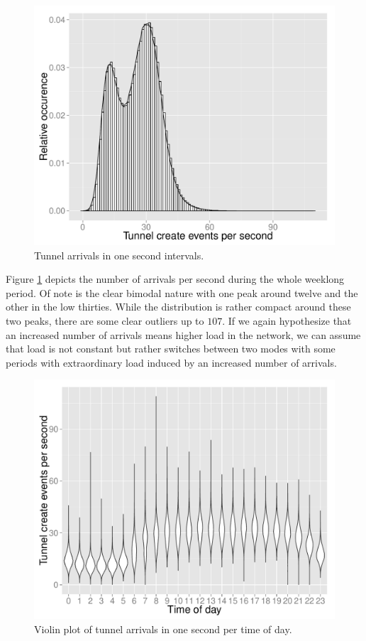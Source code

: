 \begin{figure}[htb]
	\centering
	\includegraphics[width=\columnwidth]{images/create_freq.pdf}
	\caption{Tunnel arrivals in one second intervals.}
	\label{c4:fig:freq-arrivals}
\end{figure}

Figure \ref{c4:fig:freq-arrivals} depicts the number of arrivals per second during the whole weeklong period. Of note is the clear bimodal nature with one peak around twelve and the other in the low thirties. While the distribution is rather compact around these two peaks, there are some clear outliers up to $107$.
If we again hypothesize that an increased number of arrivals means higher load in the network, we can assume that load is not constant but rather switches between two modes with some periods with extraordinary load induced by an increased number of arrivals.

\begin{figure}[htb]
	\centering
	\includegraphics[width=\columnwidth]{images/R-createspersecond-1h-violin.pdf}
	\caption{Violin plot of tunnel arrivals in one second per time of day.}
	\label{c4:fig:freq-arrivals-per-second-violin}
\end{figure}

